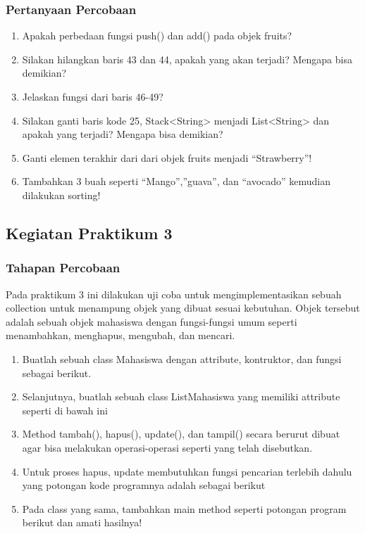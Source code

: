 \documentclass[12pt,titlepage]{article}
\begin{document}
\subsubsection{Pertanyaan Percobaan}
\begin{enumerate}
    \item Apakah perbedaan fungsi push() dan add() pada objek fruits?
    \item Silakan hilangkan baris 43 dan 44, apakah yang akan terjadi? Mengapa bisa demikian?
    \item Jelaskan fungsi dari baris 46-49?
    \item Silakan ganti baris kode 25, Stack<String> menjadi List<String> dan apakah yang terjadi? Mengapa bisa demikian?
    \item Ganti elemen terakhir dari dari objek fruits menjadi “Strawberry”!
    \item Tambahkan 3 buah seperti “Mango”,”guava”, dan “avocado” kemudian dilakukan sorting!
\end{enumerate}

\subsection{Kegiatan Praktikum 3}
\subsubsection{Tahapan Percobaan}
Pada praktikum 3 ini dilakukan uji coba untuk mengimplementasikan sebuah collection untuk menampung objek yang dibuat sesuai kebutuhan. Objek tersebut adalah sebuah objek mahasiswa dengan fungsi-fungsi umum seperti menambahkan, menghapus, mengubah, dan mencari.
\begin{enumerate}
    \item Buatlah sebuah class Mahasiswa dengan attribute, kontruktor, dan fungsi sebagai berikut.
    \item Selanjutnya, buatlah sebuah class ListMahasiswa yang memiliki attribute seperti di bawah ini
    \item Method tambah(), hapus(), update(), dan tampil() secara berurut dibuat agar bisa melakukan operasi-operasi seperti yang telah disebutkan.
    \item Untuk proses hapus, update membutuhkan fungsi pencarian terlebih dahulu yang potongan kode programnya adalah sebagai berikut
    \item Pada class yang sama, tambahkan main method seperti potongan program berikut dan amati hasilnya!
\end{enumerate}
\end{document}
